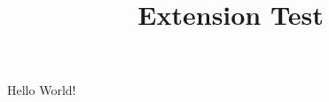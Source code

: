 \documentclass{article}
\begin{document}
\title{Extension Test}
\maketitle
Hello World!
\end{document}
